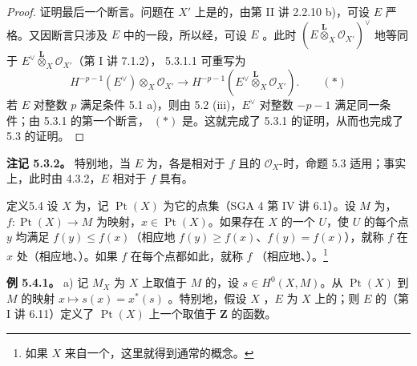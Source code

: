 \begin{proof}
证明最后一个断言。问题在 $X'$ 上是的，由第 II 讲 2.2.10 b)，可设 $E$ 严格。又因断言只涉及 $E$ 中的一段，所以经，可设 $E$ 。此时 $(E\mathbin{\overset{\mathbf L}{\otimes}}_X\mathcal O_{X'})^\vee$ 地等同于 $E^\vee\mathbin{\overset{\mathbf L}{\otimes}}_X\mathcal O_{X'}$（第 I 讲 7.1.2）， 5.3.1.1 可重写为
\[
H^{-p-1}(E^\vee)\otimes_X\mathcal O_{X'}\longrightarrow
H^{-p-1}(E^\vee\mathbin{\overset{\mathbf L}{\otimes}}_X\mathcal O_{X'}).\qquad(*)
\]
若 $E$ 对整数 $p$ 满足条件 5.1 a)，则由 5.2 (iii)，$E^\vee$ 对整数 $-p-1$ 满足同一条件；由 5.3.1 的第一个断言， $(*)$ 是。这就完成了 5.3.1 的证明，从而也完成了 5.3 的证明。
\end{proof}
\textbf{注记 5.3.2。} 特别地，当 $E$ 为，各是相对于 $f$ 且的 $\mathcal O_X$-时，命题 5.3 适用；事实上，此时由 4.3.2，$E$ 相对于 $f$ 具有。

\begin{SGAresult}{定义}{5.4}
设 $X$ 为，记 $\operatorname{Pt}(X)$ 为它的点集（SGA 4 第 IV 讲 6.1）。设 $M$ 为，$f:\operatorname{Pt}(X)\to M$ 为映射，$x\in\operatorname{Pt}(X)$。如果存在 $X$ 的一个 $U$，使 $U$ 的每个点 $y$ 均满足 $f(y)\leq f(x)$（相应地 $f(y)\geq f(x)$、$f(y)=f(x)$），就称 $f$ 在 $x$ 处（相应地、）。如果 $f$ 在每个点都如此，就称 $f$ （相应地、）。\footnote{如果 $X$ 来自一个，这里就得到通常的概念。}
\end{SGAresult}
\textbf{例 5.4.1。} a) 记 $M_X$ 为 $X$ 上取值于 $M$ 的，设 $s\in H^0(X,M)$。从 $\operatorname{Pt}(X)$ 到 $M$ 的映射 $x\mapsto s(x)=x^*(s)$ 。特别地，假设 $X$ ，$E$ 为 $X$ 上的；则 $E$ 的（第 I 讲 6.11）定义了 $\operatorname{Pt}(X)$ 上一个取值于 $\mathbf Z$ 的函数。

